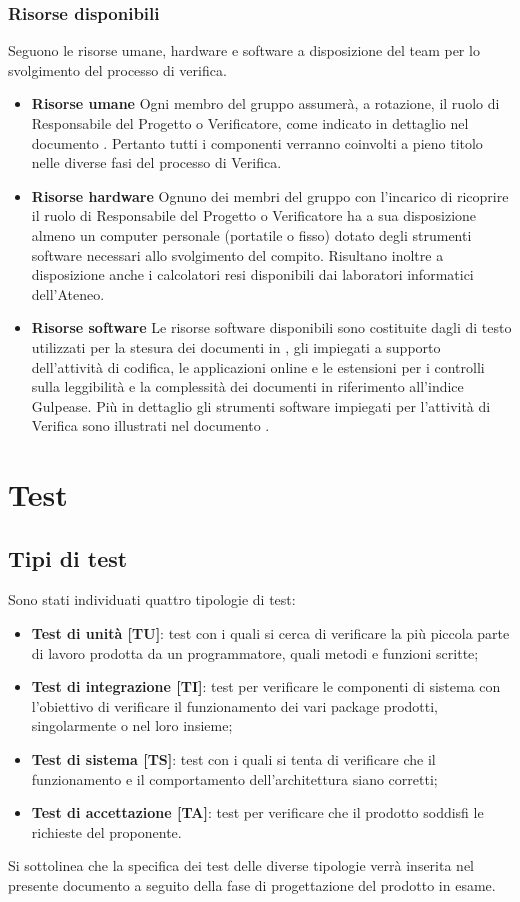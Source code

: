 		\subsubsection{Risorse disponibili}
		Seguono le risorse umane, hardware e software a disposizione del team per lo svolgimento del processo di verifica.
		\begin{itemize}
			\item \textbf{Risorse umane}
			Ogni membro del gruppo assumerà, a rotazione, il ruolo di Responsabile del Progetto o Verificatore, come indicato in dettaglio nel documento \PdP. Pertanto tutti i componenti verranno coinvolti a pieno titolo nelle diverse fasi del processo di Verifica.
			\item \textbf{Risorse hardware}
			Ognuno dei membri del gruppo con l'incarico di ricoprire il ruolo di Responsabile del Progetto o Verificatore ha a sua disposizione almeno un computer personale (portatile o fisso) dotato degli strumenti software necessari allo svolgimento del compito. Risultano inoltre a disposizione anche i calcolatori resi disponibili dai laboratori informatici dell'Ateneo.
			\item \textbf{Risorse software}
			Le risorse software disponibili sono costituite dagli  di testo utilizzati per la stesura dei documenti in , gli  impiegati a supporto dell'attività di codifica, le applicazioni online e le estensioni per i controlli sulla leggibilità e la complessità dei documenti in riferimento all'indice Gulpease. Più in dettaglio gli strumenti software impiegati per l'attività di Verifica sono illustrati nel documento \NdP.
			\end{itemize}
		


\section{Test}
	\subsection{Tipi di test}
	Sono stati individuati quattro tipologie di test:
	\begin{itemize}
		\item \textbf{Test di unità [TU]}: test con i quali si cerca di verificare la più piccola parte di lavoro prodotta da un programmatore, quali metodi e funzioni scritte;
		\item \textbf{Test di integrazione [TI]}: test per verificare le componenti di sistema con l'obiettivo di verificare il funzionamento dei vari package prodotti, singolarmente o nel loro insieme;
		\item \textbf{Test di sistema [TS]}: test con i quali si tenta di verificare che il funzionamento e il comportamento dell'architettura siano corretti;
		\item \textbf{Test di accettazione [TA]}: test per verificare che il prodotto soddisfi le richieste del proponente.
	\end{itemize}
	Si sottolinea che la specifica dei test delle diverse tipologie verrà inserita nel presente documento a seguito della fase di progettazione del prodotto in esame.




